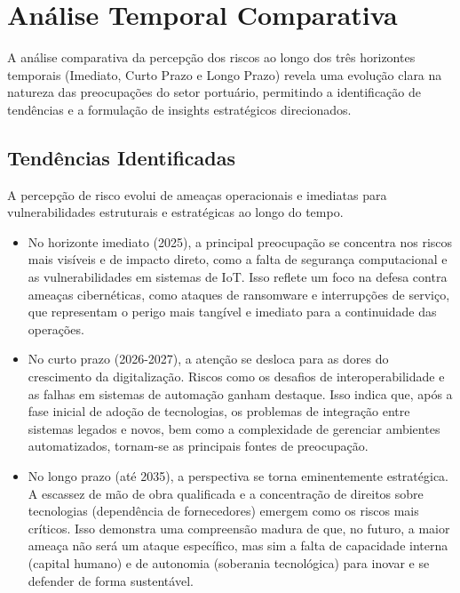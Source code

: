 \documentclass[
  portuguese,
  letterpaper,
  DIV=11,
  numbers=noendperiod]{scrreprt}
\begin{document}
\section{Análise Temporal
Comparativa}\label{anuxe1lise-temporal-comparativa-4}

A análise comparativa da percepção dos riscos ao longo dos três
horizontes temporais (Imediato, Curto Prazo e Longo Prazo) revela uma
evolução clara na natureza das preocupações do setor portuário,
permitindo a identificação de tendências e a formulação de insights
estratégicos direcionados.

\subsection{Tendências
Identificadas}\label{tenduxeancias-identificadas-4}

A percepção de risco evolui de ameaças operacionais e imediatas para
vulnerabilidades estruturais e estratégicas ao longo do tempo.

\begin{itemize}
\item
  No horizonte imediato (2025), a principal preocupação se concentra nos
  riscos mais visíveis e de impacto direto, como a falta de segurança
  computacional e as vulnerabilidades em sistemas de IoT. Isso reflete
  um foco na defesa contra ameaças cibernéticas, como ataques de
  ransomware e interrupções de serviço, que representam o perigo mais
  tangível e imediato para a continuidade das operações.
\item
  No curto prazo (2026-2027), a atenção se desloca para as dores do
  crescimento da digitalização. Riscos como os desafios de
  interoperabilidade e as falhas em sistemas de automação ganham
  destaque. Isso indica que, após a fase inicial de adoção de
  tecnologias, os problemas de integração entre sistemas legados e
  novos, bem como a complexidade de gerenciar ambientes automatizados,
  tornam-se as principais fontes de preocupação.
\item
  No longo prazo (até 2035), a perspectiva se torna eminentemente
  estratégica. A escassez de mão de obra qualificada e a concentração de
  direitos sobre tecnologias (dependência de fornecedores) emergem como
  os riscos mais críticos. Isso demonstra uma compreensão madura de que,
  no futuro, a maior ameaça não será um ataque específico, mas sim a
  falta de capacidade interna (capital humano) e de autonomia (soberania
  tecnológica) para inovar e se defender de forma sustentável.
\end{itemize}
\end{document}
